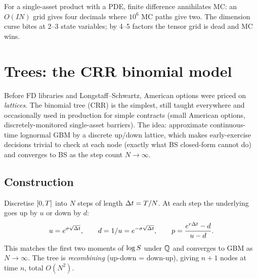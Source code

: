 \begin{intuitionbox}
For a single-asset product with a PDE, finite difference annihilates
MC: an $O(IN)$ grid gives four decimals where $10^6$ MC paths give
two.  The dimension curse bites at 2--3 state variables; by 4--5
factors the tensor grid is dead and MC wins.
\end{intuitionbox}


\section{Trees: the CRR binomial model}
\label{sec:crr_trees}

Before FD libraries and Longstaff--Schwartz, American options were
priced on \emph{lattices}.  The \citet{coxrossrubinstein1979}
binomial tree (CRR) is the simplest, still taught everywhere and
occasionally used in production for simple contracts (small American
options, discretely-monitored single-asset barriers).  The idea:
approximate continuous-time lognormal GBM by a discrete up/down
lattice, which makes early-exercise decisions trivial to check at
each node (exactly what BS closed-form cannot do) and converges to
BS as the step count $N \to \infty$.

\subsection{Construction}

Discretise $[0, T]$ into $N$ steps of length $\Delta t = T/N$.
At each step the underlying goes up by $u$ or down by $d$:
\begin{equation}
  u = e^{\sigma \sqrt{\Delta t}},
  \qquad d = 1/u = e^{-\sigma \sqrt{\Delta t}},
  \qquad p = \frac{e^{r \Delta t} - d}{u - d}.
\end{equation}
This matches the first two moments of $\log S$ under $\mathbb{Q}$ and
converges to GBM as $N \to \infty$.  The tree is \emph{recombining}
(up-down = down-up), giving $n+1$ nodes at time $n$, total $O(N^2)$.

